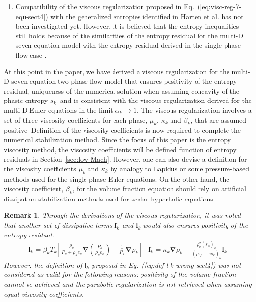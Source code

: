 \documentclass[preprint,10pt]{elsarticle}
\newcommand{\grad}{\mbold{\nabla}}
\newcommand{\mbold}[1]{\boldsymbol#1}
\newtheorem*{remark}{Remark}
\newcommand{\eqt}[1]{Eq.~(\ref{#1})}                     %
\newcommand{\sct}[1]{Section~\ref{#1}}                   %
\newcommand{\tcr}[1]{\textcolor{red}{#1}}
\newcommand{\tcb}[1]{\textcolor{blue}{#1}}
\begin{document}
\begin{enumerate}
\item{Compatibility of the viscous regularization proposed in \eqt{eq:visc-reg-7-equ-sect4} with the generalized entropies identified in Harten et al. \cite{Harten} has not been investigated yet. However, it is believed that the entropy inequalities still holds because of the similarities of the entropy residual for the multi-D seven-equation model with the entropy residual derived in the single phase flow case \cite{jlg}.} 
\end{enumerate}
%
At this point in the paper, we have derived a viscous regularization for the multi-D seven-equation two-phase flow model that ensures positivity of the entropy residual, uniqueness of the numerical solution when assuming concavity of the phasic entropy $s_k$, and is consistent with the viscous regularization derived for the multi-D Euler equations \cite{jlg, Marco_paper_low_mach} in the limit $\alpha_k \to 1$. The viscous regularization involves a set of three viscosity coefficients for each phase, $\mu_k$, $\kappa_k$ and $\beta_k$, that are assumed positive. Definition of the viscosity coefficients is now required to complete the numerical stabilization method. Since the focus of this paper is the entropy viscosity method, the viscosity coefficients will be defined function of entropy residuals in \sct{sec:low-Mach}. However, one can also devise a definition for the viscosity coefficients $\mu_k$ and $\kappa_k$ by analogy to Lapidus \cite{Lapidus_paper, Lapidus_book} or some pressure-based methods \cite{PBV_book} used for the single-phase Euler equations. On the other hand, the viscosity coefficient, $\beta_k$, for the volume fraction equation should rely on artificial dissipation stabilization methods used for scalar hyperbolic equations. 
%
\begin{remark}
Through the derivations of the viscous regularization, it was noted that another set of dissipative terms $\mbold f_k$ and $\mbold l_k$ would also ensures positivity of the entropy residual:
%
\begin{subequations}
\begin{align}\label{eq:def-l-k-wrong-sect4}
\mbold l_k =\beta_k T_k \left[ \frac{\rho_k}{P_k+\rho_k e_k} \grad \left( \frac{P_k}{\rho_k e_k} \right) - \frac{1}{P_k} \grad \rho_k \right]
\end{align}
\begin{align}
\mbold f_k = \kappa_k \grad \rho_k +  \frac{\rho^2_k (s_{\rho})_k}{\left( \rho s_{\rho} - e s_e \right)_k} \mbold l_k
\end{align}
\end{subequations}
%
However, the definition of $\mbold l_k$ proposed in \eqt{eq:def-l-k-wrong-sect4} was not considered as valid for the following reasons: positivity of the volume fraction cannot be achieved and the parabolic regularization is not retrieved when assuming equal viscosity coefficients.
\end{remark}
%
\end{document}
